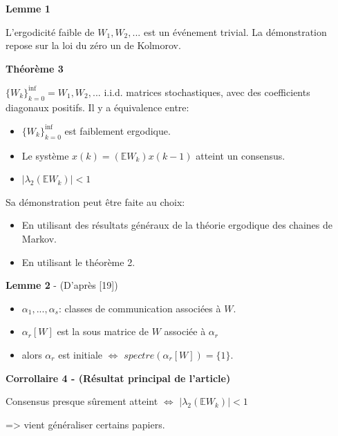\documentclass{beamer}
\begin{document}
\begin{frame}
	\textbf{Lemme 1}
	
	L'ergodicité faible de $W_1, W_2, ... $ est un événement trivial.
	\bigbreak
	\pause
	La démonstration repose sur la loi du zéro un de Kolmorov.
	
	\pause
	\textbf{Théorème 3}
	\begin{center}
		$\{W_k\}_{k=0}^{\inf} = W_1, W_2, ...$ i.i.d. matrices stochastiques, 
		avec des coefficients diagonaux positifs.
		\pause
		Il y a équivalence entre:
		\begin{itemize}
			\item $\{W_k\}_{k=0}^{\inf}$ est faiblement ergodique.
			\pause
			\item Le système $x(k) = (\mathbb{E}W_k)x(k-1)$ atteint un consensus.
			\pause
			\item $| \lambda_2(\mathbb{E}W_k)| < 1$
		\end{itemize}
	\end{center}
	\pause
	\bigbreak
	Sa démonstration peut être faite au choix:
	\begin{itemize}
		\item En utilisant des résultats généraux de la théorie ergodique des chaines de Markov.
		\item En utilisant le théorème 2.
	\end{itemize}
\end{frame}
\begin{frame}
	\textbf{Lemme 2} - (D'après [19])
	\begin{itemize}
		\item $\alpha_1, ..., \alpha_s$: classes de communication associées à $W$.
		\item $\alpha_r[W]$ est la sous matrice de $W$ associée à $\alpha_r$
		\item alors $\alpha_r$ est initiale $\iff$ $spectre(\alpha_r[W]) = \{1\}$.
	\end{itemize}
\end{frame}
\begin{frame}
	\textbf{Corrollaire 4 - (Résultat principal de l'article)}
	\begin{center}
		Consensus presque sûrement atteint
		$\iff$
		$|\lambda_{2}(\mathbb{E}W_k)| < 1$
	\end{center}
	\bigbreak
	=> vient généraliser certains papiers.
\end{frame}
\end{document}
